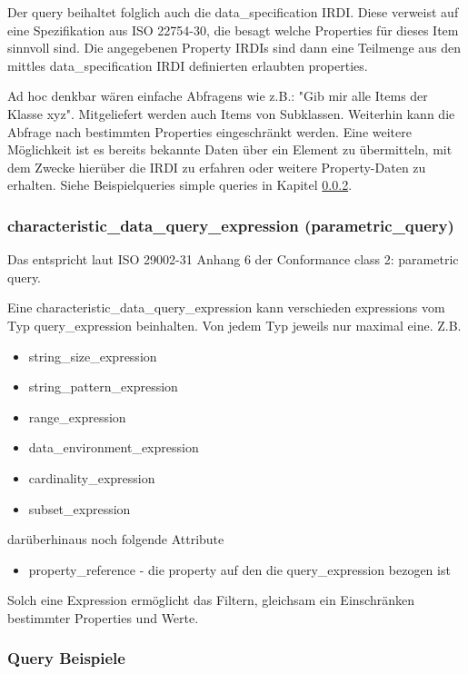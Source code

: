 Der query beihaltet folglich auch die data\_specification IRDI. Diese verweist auf eine Spezifikation aus ISO 22754-30, die besagt welche Properties für dieses Item sinnvoll sind. Die angegebenen Property IRDIs sind dann eine Teilmenge aus den mittles data\_specification IRDI definierten erlaubten properties. 

Ad hoc denkbar wären einfache Abfragens wie z.B.: "Gib mir alle Items der Klasse xyz". Mitgeliefert werden auch Items von Subklassen. Weiterhin kann die Abfrage nach bestimmten Properties eingeschränkt werden. Eine weitere Möglichkeit ist es bereits bekannte Daten über ein Element zu übermitteln, mit dem Zwecke hierüber die IRDI zu erfahren oder weitere Property-Daten zu erhalten. Siehe Beispielqueries simple queries in Kapitel \ref{kap:query_beispiele}. 

\subsubsection{characteristic\_data\_query\_expression (parametric\_query)}
Das entspricht laut ISO 29002-31 Anhang 6 der Conformance class 2: parametric query.

Eine characteristic\_data\_query\_expression kann verschieden expressions vom Typ query\_expression beinhalten. Von jedem Typ jeweils nur maximal eine. 
Z.B.
\begin{itemize}
\item string\_size\_expression
\item string\_pattern\_expression
\item range\_expression
\item data\_environment\_expression
\item cardinality\_expression
\item subset\_expression
\end{itemize}
darüberhinaus noch folgende Attribute

\begin{itemize}
\item property\_reference - die property auf den die query\_expression bezogen ist
\end{itemize}
Solch eine Expression ermöglicht das Filtern, gleichsam ein Einschränken bestimmter Properties und Werte. 

\subsubsection{Query Beispiele}\label{kap:query_beispiele}

